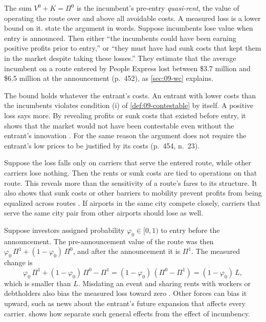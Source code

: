 The sum $V^0 + K = \Pi^0$ is the incumbent's pre-entry \emph{quasi-rent}, the value of operating the route over and
above all avoidable costs. A measured loss is a lower bound on it. \citet[p.~447]{WhinstonCollins1992} state the
argument in words. Suppose incumbents lose value when entry is announced. Then either ``the incumbents could
have been earning positive profits prior to entry,'' or ``they must have had sunk costs that kept them in the
market despite taking these losses.'' They estimate that the average incumbent on a route entered by People Express lost
between \$3.7 million and \$6.5 million at the announcement (p.~452), as \cref{sec:09-wc} explains.

\begin{remark}\label{rem:09-lowcost}
The bound holds whatever the entrant's costs. An entrant with lower costs than the incumbents violates
condition (i) of \cref{def:09-contestable} by itself. A positive loss says more. By revealing profits or sunk
costs that existed before entry, it shows that the market would not have been contestable even without the
entrant's innovation \citep[p.~447]{WhinstonCollins1992}. For the same reason the argument does not require the
entrant's low prices to be justified by its costs (p.~454, n.~23).
\end{remark}

\begin{remark}[Localization]\label{rem:09-localization}
Suppose the loss falls only on carriers that serve the entered route, while other carriers lose nothing. Then
the rents or sunk costs are tied to operations on that route. This reveals more than the sensitivity of a
route's fares to its structure. It also shows that sunk costs or other barriers to mobility prevent profits from
being equalized across routes \citep[pp.~447--448]{WhinstonCollins1992}. If airports in the same city compete
closely, carriers that serve the same city pair from other airports should lose as well.
\end{remark}

\begin{remark}\label{rem:09-anticipation}
Suppose investors assigned probability $\varphi_0 \in [0,1)$ to entry before the announcement. The pre-announcement
value of the route was then $\varphi_0\,\Pi^1 + (1-\varphi_0)\,\Pi^0$, and after the announcement it is $\Pi^1$. The
measured change is
\begin{equation*}
  \varphi_0\,\Pi^1 + (1-\varphi_0)\,\Pi^0 - \Pi^1 = (1-\varphi_0)\,(\Pi^0 - \Pi^1) = (1-\varphi_0)\,L,
\end{equation*}
which is smaller than $L$. Misdating an event and sharing rents with workers or debtholders also bias the
measured loss toward zero \citep[p.~453]{WhinstonCollins1992}. Other forces can bias it upward, such as news
about the entrant's future expansion that affects every carrier.  shows how
\citeauthor{WhinstonCollins1992} separate such general effects from the effect of incumbency.
\end{remark}

